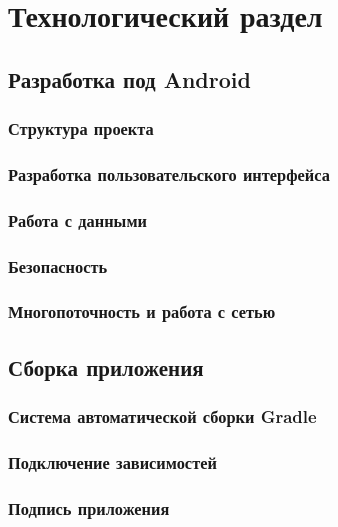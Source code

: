 \chapter{Технологический раздел}
\label{ch:tech}


\section{Разработка под Android}
\label{sec:dev}

\subsection{Структура проекта}
\label{subsec:arch}

\subsection{Разработка пользовательского интерфейса}
\label{subsec:ui}

\subsection{Работа с данными}
\label{subsec:data}

\subsection{Безопасность}
\label{subsec:security}

\subsection{Многопоточность и работа с сетью}
\label{subsec:async}


\section{Сборка приложения}
\label{sec:build}

\subsection{Система автоматической сборки Gradle}
\label{subsec:gradle}

\subsection{Подключение зависимостей}
\label{subsec:libs}

\subsection{Подпись приложения}
\label{subsec:signing}

